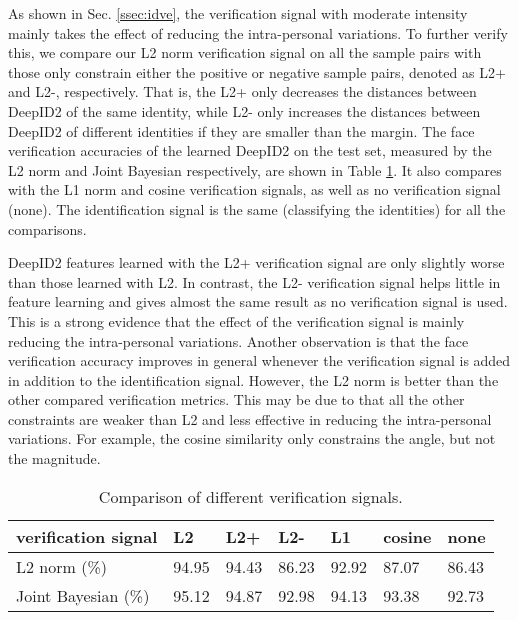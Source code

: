 \documentclass{article} \usepackage{nips14submit_e,times}
\begin{document}
As shown in Sec. \ref{ssec:idve}, the verification signal with moderate intensity mainly takes the effect of reducing the intra-personal variations. To further verify this, we compare our L2 norm verification signal on all the sample pairs with those only constrain either the positive or negative sample pairs, denoted as L2+ and L2-, respectively. That is, the L2+ only decreases the distances between DeepID2 of the same identity, while L2- only increases the distances between DeepID2 of different identities if they are smaller than the margin. The face verification accuracies of the learned DeepID2 on the test set, measured by the L2 norm and Joint Bayesian respectively, are shown in Table \ref{tab:verif}. It also compares with the L1 norm and cosine verification signals, as well as no verification signal (none). The identification signal is the same (classifying the  identities) for all the comparisons.

DeepID2 features learned with the L2+ verification signal are only slightly worse than those learned with L2. In contrast, the L2- verification signal helps little in feature learning and gives almost the same result as no verification signal is used. This is a strong evidence that the effect of the verification signal is mainly reducing the intra-personal variations. Another observation is that the face verification accuracy improves in general whenever the verification signal is added in addition to the identification signal. However, the L2 norm is better than the other compared verification metrics. This may be due to that all the other constraints are weaker than L2 and less effective in reducing the intra-personal variations. For example, the cosine similarity only constrains the angle, but not the magnitude.

\begin{table}[t]
\caption{Comparison of different verification signals.}
\label{tab:verif}
\vspace{-0.0in}
\begin{center}
\begin{tabular}{p{75pt}|p{23pt}p{23pt}p{23pt}p{23pt}p{23pt}p{23pt}}
\toprule
verification signal & L2 & L2+ & L2- & L1 & cosine & none \\
\midrule
L2 norm (\%) & 94.95 & 94.43 & 86.23 & 92.92 & 87.07 & 86.43 \\
Joint Bayesian (\%) & 95.12 & 94.87 & 92.98 & 94.13 & 93.38 & 92.73 \\
\bottomrule
\end{tabular}
\end{center}
\vspace{-0.1in}
\end{table}
\end{document}
